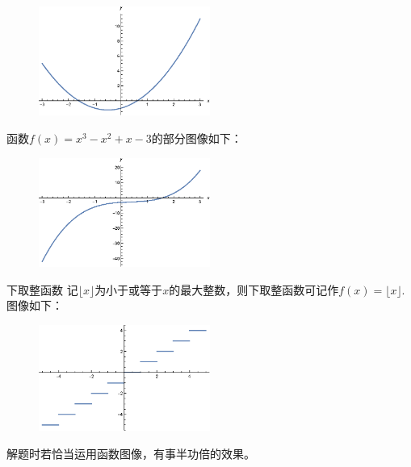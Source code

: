 \documentclass[lang=cn,math=cm,chinesefont=nofont,11pt,scheme=chinese,onecol]{elegantbook}
\begin{document}
\begin{figure}[h]
  \centering
  \includegraphics[width=0.5\textwidth]{image/2.1.5function1.eps}
  \label{img:2.1.5function1}
\end{figure}

\begin{example}
  函数$f(x)=x^3-x^2+x-3$的部分图像如下：
\end{example}

\begin{figure}[h]
  \centering
  \includegraphics[width=0.5\textwidth]{image/2.1.5function2.eps}
  \label{img:2.1.5function2}
\end{figure}

\begin{example}{下取整函数}
  记$\lfloor x\rfloor $为小于或等于$x$的最大整数，则下取整函数可记作$f(x)=\lfloor x\rfloor$.图像如下：
\end{example}

\begin{figure}[h]
  \centering
  \includegraphics[width=0.5\textwidth]{image/2.1.5function5.eps}
  \label{img:2.1.5function5}
\end{figure}

解题时若恰当运用函数图像，有事半功倍的效果。
\end{document}
